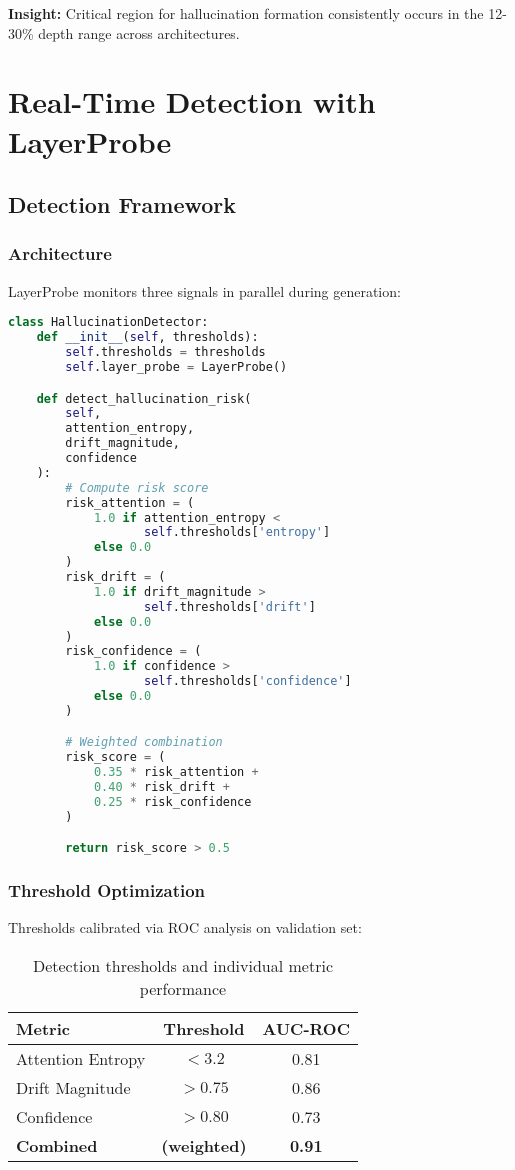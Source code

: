 \documentclass[11pt]{article}
\begin{document}
\textbf{Insight:} Critical region for hallucination formation consistently occurs in the 12-30\% depth range across architectures.

\section{Real-Time Detection with LayerProbe}

\subsection{Detection Framework}

\subsubsection{Architecture}

LayerProbe monitors three signals in parallel during generation:

\begin{lstlisting}[language=Python, caption=Real-time Detection]
class HallucinationDetector:
    def __init__(self, thresholds):
        self.thresholds = thresholds
        self.layer_probe = LayerProbe()

    def detect_hallucination_risk(
        self,
        attention_entropy,
        drift_magnitude,
        confidence
    ):
        # Compute risk score
        risk_attention = (
            1.0 if attention_entropy <
                   self.thresholds['entropy']
            else 0.0
        )
        risk_drift = (
            1.0 if drift_magnitude >
                   self.thresholds['drift']
            else 0.0
        )
        risk_confidence = (
            1.0 if confidence >
                   self.thresholds['confidence']
            else 0.0
        )

        # Weighted combination
        risk_score = (
            0.35 * risk_attention +
            0.40 * risk_drift +
            0.25 * risk_confidence
        )

        return risk_score > 0.5
\end{lstlisting}

\subsubsection{Threshold Optimization}

Thresholds calibrated via ROC analysis on validation set:

\begin{table}[H]
\centering
\begin{tabular}{@{}lcc@{}}
\toprule
\textbf{Metric} & \textbf{Threshold} & \textbf{AUC-ROC} \\ \midrule
Attention Entropy & $< 3.2$ & 0.81 \\
Drift Magnitude & $> 0.75$ & 0.86 \\
Confidence & $> 0.80$ & 0.73 \\
\textbf{Combined} & \textbf{(weighted)} & \textbf{0.91} \\ \bottomrule
\end{tabular}
\caption{Detection thresholds and individual metric performance}
\end{table}
\end{document}
